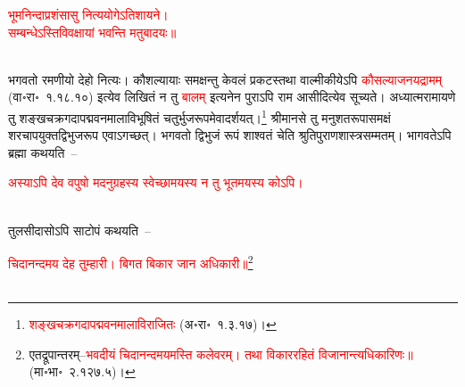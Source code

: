 \centering\textcolor{red}{भूमनिन्दाप्रशंसासु नित्ययोगेऽतिशायने।\nopagebreak\\
सम्बन्धेऽस्तिविवक्षायां भवन्ति मतुबादयः॥}\nopagebreak\\
\\
\begin{sloppypar}\justifying\noindent\hspace{10mm} भगवतो रमणीयो देहो नित्यः। कौशल्यायाः समक्षन्तु केवलं प्रकटस्तथा वाल्मीकीयेऽपि \textcolor{red}{कौसल्याजनयद्रामम्‌} (वा॰रा॰~१.१८.१०) इत्येव लिखितं न तु \textcolor{red}{बालम्‌} इत्यनेन पुराऽपि राम आसीदित्येव सूच्यते। अध्यात्म\-रामायणे तु शङ्ख\-चक्र\-गदा\-पद्म\-वन\-माला\-विभूषितं चतुर्भुज\-रूपमेवादर्शयत्।\footnote{\textcolor{red}{शङ्ख\-चक्र\-गदा\-पद्म\-वन\-माला\-विराजितः} (अ॰रा॰~१.३.१७)।} श्रीमानसे तु मनु\-शतरूपा\-समक्षं शर\-चाप\-युक्त\-द्वि\-भुजरूप एवाऽगच्छत्। भगवतो द्विभुजं रूपं शाश्वतं चेति श्रुति\-पुराण\-शास्त्र\-सम्मतम्। भागवतेऽपि ब्रह्मा कथयति~–\end{sloppypar}
\centering\textcolor{red}{अस्याऽपि देव वपुषो मदनुग्रहस्य स्वेच्छामयस्य न तु भूतमयस्य कोऽपि।}\nopagebreak\\
\\
\begin{sloppypar}\justifying\noindent तुलसीदासोऽपि साटोपं कथयति~–\end{sloppypar}
\centering\textcolor{red}{चिदानन्दमय देह तुम्हारी। बिगत बिकार जान अधिकारी॥}\footnote{एतद्रूपान्तरम्–\textcolor{red}{भवदीयं चिदानन्द\-मयमस्ति कलेवरम्। तथा विकार\-रहितं विजानान्त्यधि\-कारिणः॥} (मा॰भा॰~२.१२७.५)।}\nopagebreak\\
\\
